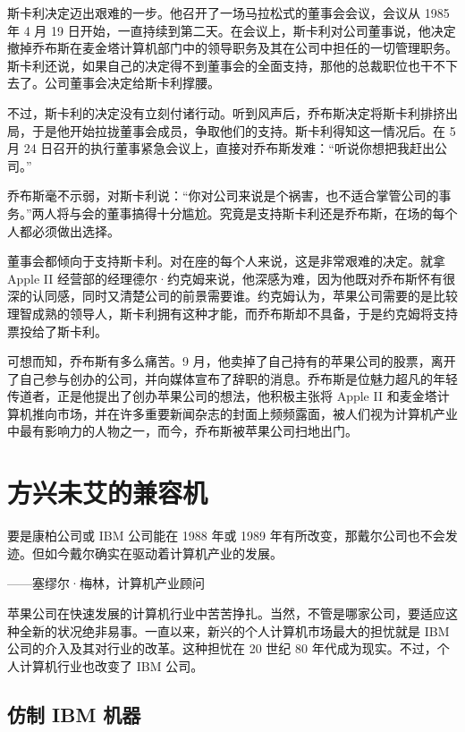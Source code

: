 \documentclass[12pt,UTF8]{ctexbook}
\begin{document}
斯卡利决定迈出艰难的一步。他召开了一场马拉松式的董事会会议，会议从 1985 年 4 月 19 日开始，一直持续到第二天。在会议上，斯卡利对公司董事说，他决定撤掉乔布斯在麦金塔计算机部门中的领导职务及其在公司中担任的一切管理职务。斯卡利还说，如果自己的决定得不到董事会的全面支持，那他的总裁职位也干不下去了。公司董事会决定给斯卡利撑腰。

不过，斯卡利的决定没有立刻付诸行动。听到风声后，乔布斯决定将斯卡利排挤出局，于是他开始拉拢董事会成员，争取他们的支持。斯卡利得知这一情况后。在 5 月 24 日召开的执行董事紧急会议上，直接对乔布斯发难：“听说你想把我赶出公司。”

乔布斯毫不示弱，对斯卡利说：“你对公司来说是个祸害，也不适合掌管公司的事务。”两人将与会的董事搞得十分尴尬。究竟是支持斯卡利还是乔布斯，在场的每个人都必须做出选择。

董事会都倾向于支持斯卡利。对在座的每个人来说，这是非常艰难的决定。就拿 Apple II 经营部的经理德尔·约克姆来说，他深感为难，因为他既对乔布斯怀有很深的认同感，同时又清楚公司的前景需要谁。约克姆认为，苹果公司需要的是比较理智成熟的领导人，斯卡利拥有这种才能，而乔布斯却不具备，于是约克姆将支持票投给了斯卡利。

可想而知，乔布斯有多么痛苦。9 月，他卖掉了自己持有的苹果公司的股票，离开了自己参与创办的公司，并向媒体宣布了辞职的消息。乔布斯是位魅力超凡的年轻传道者，正是他提出了创办苹果公司的想法，他积极主张将 Apple II 和麦金塔计算机推向市场，并在许多重要新闻杂志的封面上频频露面，被人们视为计算机产业中最有影响力的人物之一，而今，乔布斯被苹果公司扫地出门。





\section{方兴未艾的兼容机}


要是康柏公司或 IBM 公司能在 1988 年或 1989 年有所改变，那戴尔公司也不会发迹。但如今戴尔确实在驱动着计算机产业的发展。

——塞缪尔·梅林，计算机产业顾问



苹果公司在快速发展的计算机行业中苦苦挣扎。当然，不管是哪家公司，要适应这种全新的状况绝非易事。一直以来，新兴的个人计算机市场最大的担忧就是 IBM 公司的介入及其对行业的改革。这种担忧在 20 世纪 80 年代成为现实。不过，个人计算机行业也改变了 IBM 公司。





\subsection{仿制 IBM 机器}
\end{document}
